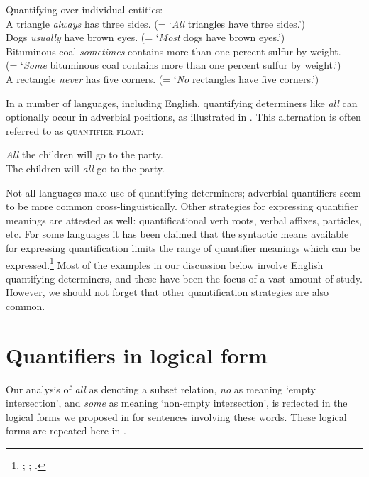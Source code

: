 \ea
Quantifying over individual entities:\\
\ea A triangle \textit{always} has three sides. (= ‘\textit{All} triangles have three sides.’)\\
\ex Dogs \textit{usually} have brown eyes. (= ‘\textit{Most} dogs have brown eyes.’)\\
\ex Bituminous coal \textit{sometimes} contains more than one percent sulfur by weight.\\
  (= ‘\textit{Some} bituminous coal contains more than one percent sulfur by weight.’)\\
\ex A rectangle \textit{never} has five corners. (= ‘\textit{No} rectangles have five corners.’)
                       \z
\z


In a number of languages, including English, quantifying determiners like \textit{all} can optionally occur in adverbial positions, as illustrated in . This alternation is often referred to as \textsc{quantifier float}:


\ea
\ea \textit{All} the children will go to the party.\\
\ex The children will \textit{all} go to the party.
                       \z
\z


Not all languages make use of quantifying determiners; adverbial quantifiers seem to be more common cross-linguistically. Other strategies for expressing quantifier meanings are attested as well: quantificational verb roots, verbal affixes, particles, etc. For some languages it has been claimed that the syntactic means available for expressing quantification limits the range of quantifier meanings which can be expressed.\footnote{\citet{Baker1995}; \citet{Bittner1995}; \citet{KoenigMichelson2010}.} Most of the examples in our discussion below involve English quantifying determiners, and these have been the focus of a vast amount of study. However, we should not forget that other quantification strategies are also common.


\section{Quantifiers in logical form}\label{sec:14.3}

Our analysis of \textit{all} as denoting a subset relation, \textit{no} as meaning ‘empty intersection’, and \textit{some} as meaning ‘non-empty intersection’, is reflected in the logical forms we proposed in  for sentences involving these words. These logical forms are repeated here in .


